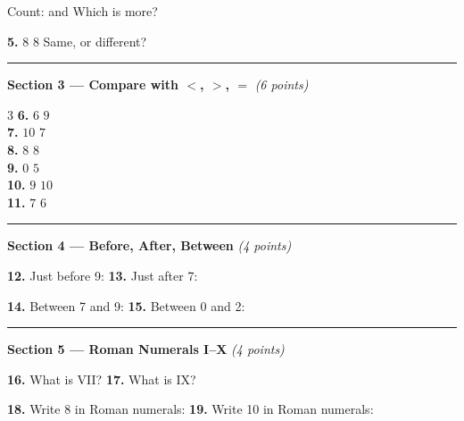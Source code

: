 \documentclass[12pt, letterpaper]{article}
\newcommand{\answerline}{\underline{\hspace{2.5cm}}}
\newcommand{\symbox}{\fbox{\hspace{0.7cm}}}
\begin{document}
\medskip
Count: \answerline \; and \; \answerline \quad
Which is more? \answerline

\bigskip
\noindent\textbf{5.} \quad $8$ \; \symbox \; $8$ \hspace{2cm} Same, or different? \hfill \answerline

\bigskip
\noindent\textcolor{scholared}{\rule{\linewidth}{0.4pt}}

\noindent\textcolor{scholared}{\large\textbf{Section 3 — Compare with $<$, $>$, $=$}} \hfill \textit{(6 points)}

\bigskip
\begin{multicols}{3}
\noindent\textbf{6.} $6$ \; \symbox \; $9$ \\[12pt]
\noindent\textbf{7.} $10$ \; \symbox \; $7$ \\

\columnbreak
\noindent\textbf{8.} $8$ \; \symbox \; $8$ \\[12pt]
\noindent\textbf{9.} $0$ \; \symbox \; $5$ \\

\columnbreak
\noindent\textbf{10.} $9$ \; \symbox \; $10$ \\[12pt]
\noindent\textbf{11.} $7$ \; \symbox \; $6$
\end{multicols}

\bigskip
\noindent\textcolor{scholared}{\rule{\linewidth}{0.4pt}}

\noindent\textcolor{scholared}{\large\textbf{Section 4 — Before, After, Between}} \hfill \textit{(4 points)}

\bigskip
\noindent\textbf{12.} Just before 9: \hfill \answerline \hspace{2cm}
\textbf{13.} Just after 7: \hfill \answerline

\bigskip
\noindent\textbf{14.} Between 7 and 9: \hfill \answerline \hspace{1.5cm}
\textbf{15.} Between 0 and 2: \hfill \answerline

\bigskip
\noindent\textcolor{scholared}{\rule{\linewidth}{0.4pt}}

\noindent\textcolor{scholared}{\large\textbf{Section 5 — Roman Numerals I–X}} \hfill \textit{(4 points)}

\bigskip
\noindent\textbf{16.} What is VII? \hfill \answerline \hspace{2cm}
\textbf{17.} What is IX? \hfill \answerline

\bigskip
\noindent\textbf{18.} Write 8 in Roman numerals: \hfill \answerline \hspace{1.2cm}
\textbf{19.} Write 10 in Roman numerals: \hfill \answerline
\end{document}
